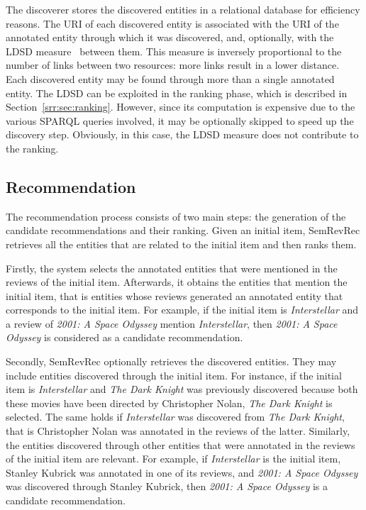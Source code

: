 The discoverer stores the discovered entities in a relational database for efficiency reasons. The URI of each discovered entity is associated with the URI of the annotated entity through which it was discovered, and, optionally, with the LDSD measure~\cite{Passant2010} between them. This measure is inversely proportional to the number of links between two resources: more links result in a lower distance. Each discovered entity may be found through more than a single annotated entity. The LDSD can be exploited in the ranking phase, which is described in Section~\ref{srr:sec:ranking}. However, since its computation is expensive due to the various SPARQL queries involved, it may be optionally skipped to speed up the discovery step. Obviously, in this case, the LDSD measure does not contribute to the ranking.

\subsection{Recommendation}
\label{srr:sec:recommendation}

The recommendation process consists of two main steps: the generation of the candidate recommendations and their ranking. Given an initial item, SemRevRec retrieves all the entities that are related to the initial item and then ranks them.

Firstly, the system selects the annotated entities that were mentioned in the reviews of the initial item. Afterwards, it obtains the entities that mention the initial item, that is entities whose reviews generated an annotated entity that corresponds to the initial item. For example, if the initial item is \emph{Interstellar} and a review of \emph{2001: A Space Odyssey} mention \emph{Interstellar}, then \emph{2001: A Space Odyssey} is considered as a candidate recommendation.

Secondly, SemRevRec optionally retrieves the discovered entities. They may include entities discovered through the initial item. For instance, if the initial item is \emph{Interstellar} and \emph{The Dark Knight} was previously discovered because both these movies have been directed by Christopher Nolan, \emph{The Dark Knight} is selected. The same holds if \emph{Interstellar} was discovered from \emph{The Dark Knight}, that is Christopher Nolan was annotated in the reviews of the latter. Similarly, the entities discovered through other entities that were annotated in the reviews of the initial item are relevant. For example, if \emph{Interstellar} is the initial item, Stanley Kubrick was annotated in one of its reviews, and \emph{2001: A Space Odyssey} was discovered through Stanley Kubrick, then \emph{2001: A Space Odyssey} is a candidate recommendation.

